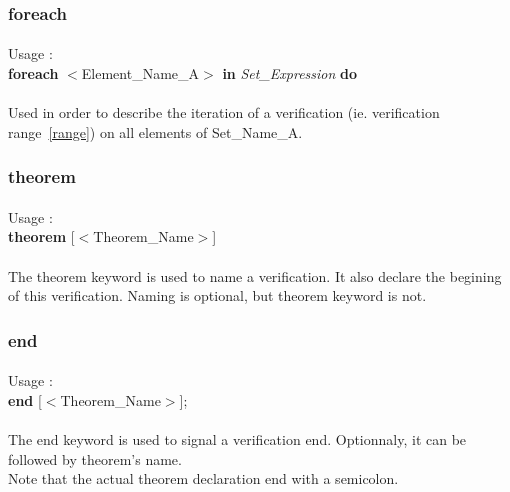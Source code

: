 \subsubsection {foreach}
\paragraph{}
Usage :\\
\textbf {foreach} $<$Element\_Name\_A$>$ \textbf{in} \textit{Set\_Expression} \textbf{do}\\

\paragraph{}
Used in order to describe the iteration of a verification (ie. 
verification range~\ref {range}) on all elements of Set\_Name\_A.

\subsubsection {theorem}
\paragraph{}
Usage :\\
\textbf {theorem} [$<$Theorem\_Name$>$]

\paragraph{}
The theorem keyword is used to name a verification. It also
declare the begining of this verification. Naming is optional, 
but theorem keyword is not.

\subsubsection {end}
\paragraph{}
Usage :\\
\textbf {end} [$<$Theorem\_Name$>$];

\paragraph{}
The end keyword is used to signal a verification end. 
Optionnaly, it can be followed by theorem's name.\\
Note that the actual theorem declaration end with a 
semicolon.

